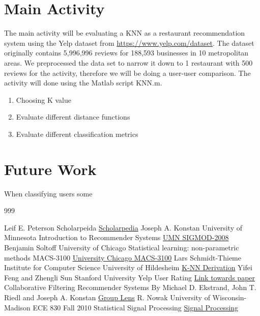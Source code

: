 \documentclass{report}
\begin{document}
\section*{Main Activity}

The main activity will be evaluating a KNN as a restaurant recommendation system using the Yelp dataset from \href{https://www.yelp.com/dataset}{https://www.yelp.com/dataset}.
The dataset originally contains 5,996,996 reviews for 188,593 businesses in 10 metropolitan areas.
We preprocessed the data set to narrow it down to 1 restaurant with 500 reviews for the activity, therefore we will be doing a user-user comparison.  
The activity will done using the Matlab script KNN.m.

\begin{enumerate}

\item Choosing K value

\item Evaluate different distance functions

\item Evaluate different classification metrics

\end{enumerate}

\section*{Future Work}
When classifying users some 

\begin {thebibliography}{999}

	Leif E. Peterson
	Scholarpeida
	\href{http://www.scholarpedia.org/article/K-nearest_neighbor}{Scholarpedia}
	Joseph A. Konstan
    University of Minnesota
    Introduction to Recommender Systems
	\href{https://www-users.cs.umn.edu/~konstan/SIGMOD-2008-Tut.pdf}{UMN SIGMOD-2008}
	Benjamin Soltoff
    University of Chicago
    Statistical learning: non-parametric methods MACS-3100
	\href{https://cfss.uchicago.edu/persp010_nonparametric.html#objectives}{University Chicago MACS-3100}
	Lars Schmidt-Thieme
	 Institute for Computer Science University of Hildesheim
	 \href{https://www.ismll.uni-hildesheim.de/lehre/ml-07w/skript/ml-2up-03-nearest-neighbor.pdf} {K-NN Derivation}
	Yifei Feng and Zhengli Sun
	Stanford University 
	Yelp User Rating
	 \href{http://cs229.stanford.edu/proj2014/Yifei%20Feng,%20Zhengli%20Sun,%20Yelp%20User%20Rating%20Prediction.pdf} {Link towards paper}
	Collaborative Filtering Recommender Systems
	By Michael D. Ekstrand, John T. Riedl
	and Joseph A. Konstan
	 \href{http://files.grouplens.org/papers/FnT%20CF%20Recsys%20Survey.pdf} {Group Lens}
	 R. Nowak
	 University of Wisconsin-Madison
	 ECE 830 Fall 2010 Statistical Signal Processing
	 \href{http://nowak.ece.wisc.edu/ece830/ece830_lecture24.pdf}{Signal Processing}
\end{thebibliography}
\end{document}
